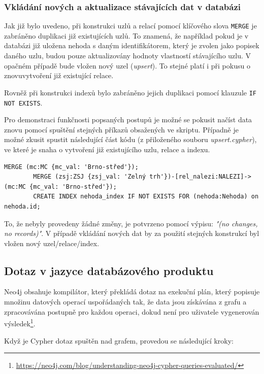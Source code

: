 \documentclass[a4paper, 11pt]{article}
\begin{document}
    \subsubsection{Vkládání nových a aktualizace stávajících dat v databázi}
    Jak již bylo uvedeno, při konstrukci uzlů a relací pomocí klíčového slova \texttt{MERGE} je zabráněno duplikaci již existujících uzlů. To znamená, že například pokud je v databázi již uložena nehoda s daným identifikátorem, který je zvolen jako popisek daného uzlu, budou pouze aktualizovány hodnoty vlastností stávajícího uzlu. V opačném případě bude vložen nový uzel (\textit{upsert}). To stejné platí i při pokusu o znovuvytvoření již existující relace.

    Rovněž při konstrukci indexů bylo zabráněno jejich duplikaci pomocí klauzule \texttt{IF NOT EXISTS}.

    Pro demonstraci funkčnosti popsaných postupů je možné se pokusit načíst data znovu pomocí spuštění stejných příkazů obsažených ve skriptu. Případně je možné zkusit spustit následující část kódu (z přiloženého souboru \textit{upsert.cypher}), ve které je snaha o vytvoření již existujícího uzlu, relace a indexu.
    
    \begin{lstlisting}[style=Cypher]        
        MERGE (mc:MC {mc_val: 'Brno-střed'});
        MERGE (zsj:ZSJ {zsj_val: 'Zelný trh'})-[rel_nalezi:NALEZI]->(mc:MC {mc_val: 'Brno-střed'});
        CREATE INDEX nehoda_index IF NOT EXISTS FOR (nehoda:Nehoda) on nehoda.id;
    \end{lstlisting}

    To, že nebyly provedeny žádné změny, je potvrzeno pomocí výpisu: \textit{"(no changes, no records)"}. V případě vkládání nových dat by za použití stejných konstrukcí byl vložen nový uzel/relace/index.

    \subsection{Dotaz v jazyce databázového produktu}
    Neo4j obsahuje kompilátor, který překládá dotaz na exekuční plán, který popisuje množinu datových operací uspořádaných tak, že data jsou získávána z grafu a zpracovávána postupně pro každou operaci, dokud není pro uživatele vygenerován výsledek\footnote{\url{https://neo4j.com/blog/understanding-neo4j-cypher-queries-evaluated/}}.

    Když je Cypher dotaz spuštěn nad grafem, provedou se následující kroky:
\end{document}

